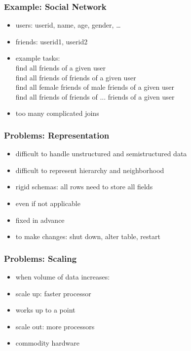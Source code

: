 \documentclass[dvipsnames]{beamer}
\theoremstyle{plain}
\begin{document}
\begin{frame}
  \frametitle{Example: Social Network}

  \begin{itemize}
    \item users: userid, name, age, gender, \ldots
    \item friends: userid1, userid2

    \medskip
    \item example tasks:\\
      find all friends of a given user\\
      find all friends of friends of a given user\\
      find all female friends of male friends of a given user\\
      find all friends of friends of ... friends of a given user\\

    \pause
    \medskip
    \item too many complicated joins
  \end{itemize}
\end{frame}

\begin{frame}
  \frametitle{Problems: Representation}

  \begin{itemize}
    \item difficult to handle unstructured and semistructured data
    \item difficult to represent hierarchy and neighborhood

    \pause
    \medskip
    \item rigid schemas: all rows need to store all fields
    \item even if not applicable
    \smallskip
    \item fixed in advance
    \item to make changes: shut down, alter table, restart
  \end{itemize}
\end{frame}

\begin{frame}
  \frametitle{Problems: Scaling}

  \begin{itemize}
    \item when volume of data increases:

    \bigskip
    \item scale up: faster processor
    \item works up to a point

    \pause
    \medskip
    \item scale out: more processors
    \item commodity hardware
  \end{itemize}
\end{frame}
\end{document}
